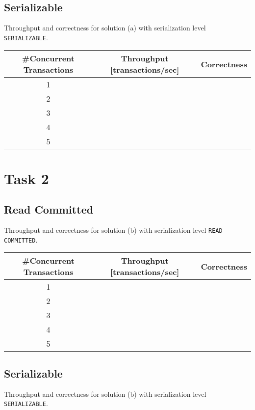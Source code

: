 \documentclass[11pt]{scrartcl}
\begin{document}
\medskip

\subsection*{Serializable}

Throughput and correctness for solution (a) with serialization level
{\tt\small SERIALIZABLE}.

\bigskip

\begin{tabular}{c|c|c}
  \#Concurrent Transactions & Throughput [transactions/sec] & Correctness
  \\\hline
  1 & & \\
  2 & & \\
  3 & & \\
  4 & & \\
  5 & & \\    
\end{tabular}

\medskip

\section*{Task 2}

\subsection*{Read Committed}

Throughput and correctness for solution (b) with serialization level
{\tt\small READ COMMITTED}.

\bigskip

\begin{tabular}{c|c|c}
  \#Concurrent Transactions & Throughput [transactions/sec] & Correctness
  \\\hline
  1 & & \\
  2 & & \\
  3 & & \\
  4 & & \\
  5 & & \\    
\end{tabular}

\medskip

\subsection*{Serializable}

Throughput and correctness for solution (b) with serialization level
{\tt\small SERIALIZABLE}.
\end{document}
